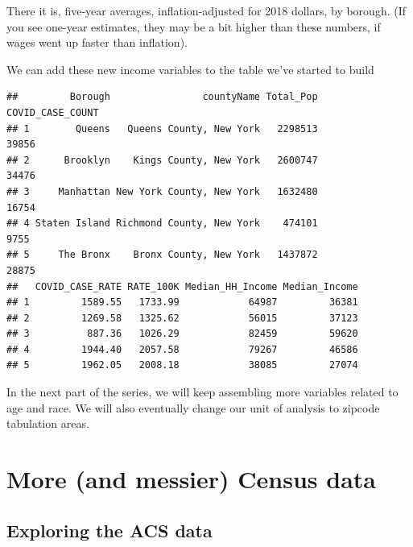 \documentclass[openany]{book}
\newenvironment{Shaded}{\begin{snugshade}}{\end{snugshade}}
\newcommand{\CommentTok}[1]{\textcolor[rgb]{0.56,0.35,0.01}{\textit{#1}}}
\newcommand{\DataTypeTok}[1]{\textcolor[rgb]{0.13,0.29,0.53}{#1}}
\newcommand{\KeywordTok}[1]{\textcolor[rgb]{0.13,0.29,0.53}{\textbf{#1}}}
\newcommand{\NormalTok}[1]{#1}
\newcommand{\OperatorTok}[1]{\textcolor[rgb]{0.81,0.36,0.00}{\textbf{#1}}}
\newcommand{\StringTok}[1]{\textcolor[rgb]{0.31,0.60,0.02}{#1}}
\begin{document}
There it is, five-year averages, inflation-adjusted for 2018 dollars, by borough. (If you see one-year estimates, they may be a bit higher than these numbers, if wages went up faster than inflation).

We can add these new income variables to the table we've started to build

\begin{Shaded}
\end{Shaded}

\begin{verbatim}
##         Borough                countyName Total_Pop COVID_CASE_COUNT
## 1        Queens   Queens County, New York   2298513            39856
## 2      Brooklyn    Kings County, New York   2600747            34476
## 3     Manhattan New York County, New York   1632480            16754
## 4 Staten Island Richmond County, New York    474101             9755
## 5     The Bronx    Bronx County, New York   1437872            28875
##   COVID_CASE_RATE RATE_100K Median_HH_Income Median_Income
## 1         1589.55   1733.99            64987         36381
## 2         1269.58   1325.62            56015         37123
## 3          887.36   1026.29            82459         59620
## 4         1944.40   2057.58            79267         46586
## 5         1962.05   2008.18            38085         27074
\end{verbatim}

In the next part of the series, we will keep assembling more variables related to age and race. We will also eventually change our unit of analysis to zipcode tabulation areas.

\hypertarget{part3}{%
\section{More (and messier) Census data}\label{part3}}

\hypertarget{exploring-the-acs-data}{%
\subsection*{Exploring the ACS data}\label{exploring-the-acs-data}}
\end{document}
